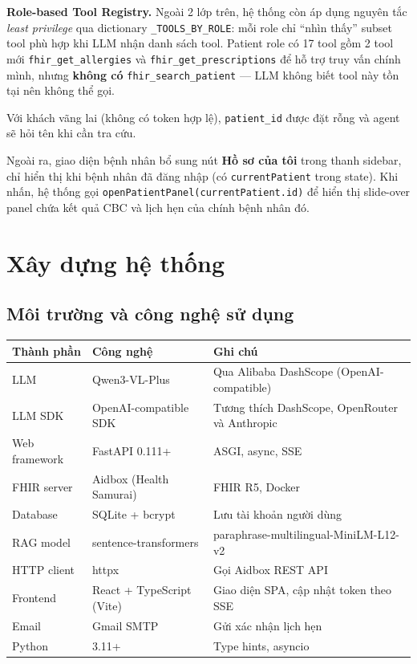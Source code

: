 \documentclass[a4paper,13pt,3p,oneside]{report}
\theoremstyle{definition}
\theoremstyle{remark}
\theoremstyle{definition}
\begin{document}
\textbf{Role-based Tool Registry.} Ngoài 2 lớp trên, hệ thống còn áp dụng nguyên tắc \textit{least privilege} qua dictionary \texttt{\_TOOLS\_BY\_ROLE}: mỗi role chỉ ``nhìn thấy'' subset tool phù hợp khi LLM nhận danh sách tool. Patient role có 17 tool gồm 2 tool mới \texttt{fhir\_get\_allergies} và \texttt{fhir\_get\_prescriptions} để hỗ trợ truy vấn chính mình, nhưng \textbf{không có} \texttt{fhir\_search\_patient} --- LLM không biết tool này tồn tại nên không thể gọi.

Với khách vãng lai (không có token hợp lệ), \texttt{patient\_id} được đặt rỗng và agent sẽ hỏi tên khi cần tra cứu.

Ngoài ra, giao diện bệnh nhân bổ sung nút \textbf{Hồ sơ của tôi} trong thanh sidebar, chỉ hiển thị khi bệnh nhân đã đăng nhập (có \texttt{currentPatient} trong state). Khi nhấn, hệ thống gọi \texttt{openPatientPanel(currentPatient.id)} để hiển thị slide-over panel chứa kết quả CBC và lịch hẹn của chính bệnh nhân đó.

\chapter{Xây dựng hệ thống}

\section{Môi trường và công nghệ sử dụng}

\begin{table}[H]
\centering
\begin{tabular}{|l|l|p{6cm}|}
\hline
\textbf{Thành phần} & \textbf{Công nghệ} & \textbf{Ghi chú} \\
\hline
LLM & Qwen3-VL-Plus & Qua Alibaba DashScope (OpenAI-compatible) \\
\hline
LLM SDK & OpenAI-compatible SDK & Tương thích DashScope, OpenRouter và Anthropic \\
\hline
Web framework & FastAPI 0.111+ & ASGI, async, SSE \\
\hline
FHIR server & Aidbox (Health Samurai) & FHIR R5, Docker \\
\hline
Database & SQLite + bcrypt & Lưu tài khoản người dùng \\
\hline
RAG model & sentence-transformers & paraphrase-multilingual-MiniLM-L12-v2 \\
\hline
HTTP client & httpx & Gọi Aidbox REST API \\
\hline
Frontend & React + TypeScript (Vite) & Giao diện SPA, cập nhật token theo SSE \\
\hline
Email & Gmail SMTP & Gửi xác nhận lịch hẹn \\
\hline
Python & 3.11+ & Type hints, asyncio \\
\hline
\end{tabular}
\end{table}
\end{document}
